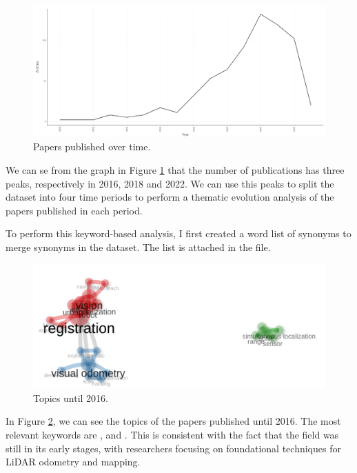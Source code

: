 \documentclass{article}
\begin{document}
\begin{figure}[!htbp]
    \centering
    \includegraphics[width=1.0\textwidth]{img/paper_production.png}
    \caption{Papers published over time.}
    \label{fig:paper_production}
\end{figure}

We can se from the graph in Figure \ref{fig:paper_production} that the number of publications has three peaks, respectively in 2016, 2018 and 2022. We can use this peaks to split the dataset into four time periods to perform a thematic evolution analysis of the papers published in each period.

 To perform this keyword-based analysis, I first created a word list of synonyms to merge synonyms in the dataset. The list is attached in the  file.

\begin{figure}[!htbp]
    \centering
    \includegraphics[width=1.0\textwidth]{img/topics_until2016.png}
    \caption{Topics until 2016.}
    \label{fig:topics_until2016}
\end{figure}

In Figure \ref{fig:topics_until2016}, we can see the topics of the papers published until 2016. The most relevant keywords are ,  and . This is consistent with the fact that the field was still in its early stages, with researchers focusing on foundational techniques for LiDAR odometry and mapping.
\end{document}
